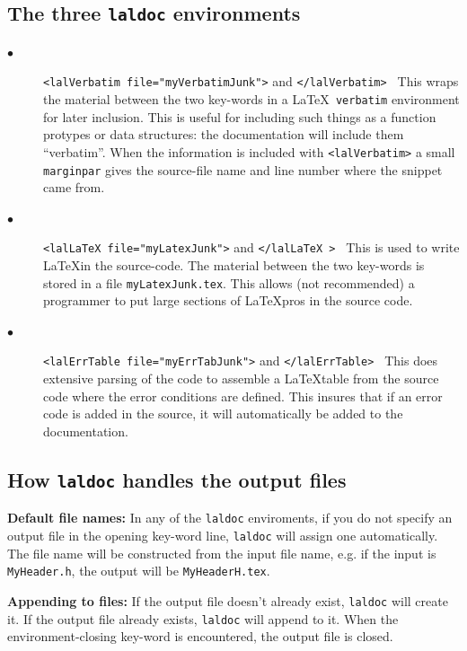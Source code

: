\documentclass[oneside]{book}
\begin{document}
{{{{\subsection{ The three {\texttt {laldoc}} environments }
\begin{description}
\item[$\bullet$ ]
{\tt <lalVerbatim file="myVerbatimJunk">}  and {\tt </lalVerbatim> }
This wraps the  material between the two key-words in a \LaTeX {\tt
verbatim} environment for later inclusion.  This is useful for
including such things as a function protypes or data structures: the
documentation will include them ``verbatim''.  When the information is
included with {\tt <lalVerbatim>} a small {\tt marginpar} gives the
source-file name and line number where the snippet came from.
\vspace*{-0.05in}
\item[$\bullet$ ] 
{\tt  <lalLaTeX file="myLatexJunk">}   and {\tt </lalLaTeX > } This is
used to write \LaTeX in the source-code. The material between the two
key-words is stored in a file {\tt myLatexJunk.tex}.  This allows (not
recommended) a programmer to put large sections of \LaTeX pros in the
source code.  
\vspace*{-0.05in}
\item[$\bullet$ ] 
{\tt <lalErrTable file="myErrTabJunk">} and {\tt </lalErrTable> } This
does extensive parsing of the code to assemble a \LaTeX table from the
source code where the error conditions are defined.  This insures that
if an error code is added in the source, it will automatically be
added to the documentation.
\vspace*{-0.051in}
\end{description}

\subsection{ How {\texttt {laldoc}} handles the output files}

{\bf Default file names:} In any of the {\texttt {laldoc}} enviroments,
if you do not specify an output file in the opening key-word line,
{\texttt {laldoc}} will assign one automatically. The file name will
be constructed from the input file name, e.g. if the input
is  {\tt MyHeader.h}, the output will be  {\tt MyHeaderH.tex}.

{\bf Appending to files:}
If the output file doesn't already exist, {\texttt {laldoc}} will
create it.  If the output file already exists, {\texttt {laldoc}} will
append to it.  When the environment-closing key-word is encountered,
the output file is closed.

}}}}
\end{document}
